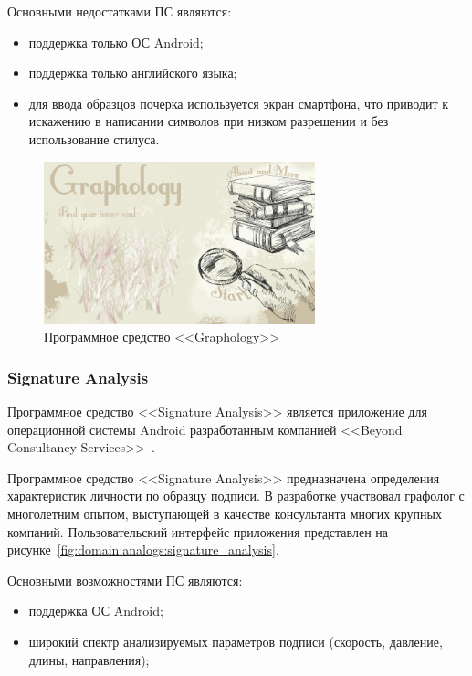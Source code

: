 Основными недостатками ПС являются:
\begin{itemize}
  \item поддержка только ОС Android;
  \item поддержка только английского языка;
  \item для ввода образцов почерка используется экран смартфона, что приводит к искажению в написании символов при низком разрешении и без использование стилуса.
\end{itemize}

\begin{figure}[ht]
    \centering
    \includegraphics[width=0.7\textwidth]{figures/graphology_analog.jpeg}
    \caption{Программное средство <<Graphology>>}
    \label{fig:domain:analogs:graphology}
\end{figure}

\subsubsection{Signature Analysis}
\label{sub:domain:analogs:signature_analysis} 

Программное средство <<Signature Analysis>> является приложение для операционной системы Android разработанным компанией <<Beyond Consultancy Services>>~\cite{analogs_signature_analysis}.

Программное средство <<Signature Analysis>> предназначена определения характеристик личности по образцу подписи. В разработке участвовал графолог с многолетним опытом, выступающей в качестве консультанта многих крупных компаний.  Пользовательский интерфейс приложения представлен на рисунке~\ref{fig:domain:analogs:signature_analysis}.

Основными возможностями ПС являются:
\begin{itemize}
  \item поддержка ОС Android;
  \item широкий спектр анализируемых параметров подписи (скорость, давление, длины, направления);
\end{itemize}

